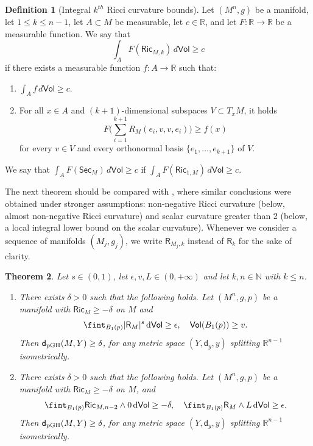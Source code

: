 \documentclass[10pt]{article}
\newtheorem{thm}{Theorem}[section]
\theoremstyle{definition}
\newtheorem{definition}[thm]{Definition}
\newcommand{\bb}[1]{\mathbb{#1}}
\newcommand{\ssf}[1]{\mathsf{#1}}
\newcommand{\Ric}{\mathsf{Ric}}
\newcommand{\sd}{\mathsf{d}}
\newcommand{\R}{\mathsf{R}}
\newcommand{\de}{{\rm d}}
\begin{document}
\begin{definition}[Integral $k^{th}$ Ricci curvature bounds] \label{D5}
Let $(M^n,g)$ be a manifold, let $1 \leq k \leq n-1$, let $A \subset M$ be measurable, let $c \in \bb{R}$, and let $F:\bb{R} \to \bb{R}$ be a measurable function.
We say that
\[
\int_{A} F(\Ric_{M,k}) \, d\ssf{Vol} \geq c
\]
if there exists a measurable function $f:A \to \bb{R}$ such that:
\begin{enumerate}
    \item $
    \int_A f \, d\ssf{Vol} \geq c.
    $
    \item For all $x \in A$ and $(k+1)$-dimensional subspaces $V \subset T_xM$, it holds
\[
F\Big( \sum_{i=1}^{k+1} R_M(e_i,v,v,e_i) \Big) \geq f(x)
\]
for every $v \in V$ and every orthonormal basis $\{e_1,\dots,e_{k+1}\}$ of $V$.
\end{enumerate}
We say that $
\int_{A} F(\ssf{Sec}_M ) \, d\ssf{Vol} \geq c
$ if $
\int_{A}  F(\Ric_{1,M}) \, d\ssf{Vol} \geq c
$.
\end{definition}

The next theorem should be compared with \cite[Theorem 1.1]{wang2023positive}, where similar conclusions were obtained under stronger assumptions: non-negative Ricci curvature (below, almost non-negative Ricci curvature) and scalar curvature greater than 2  (below, a local integral lower bound on the scalar curvature). 
Whenever we consider a sequence of manifolds $(M_j,g_j)$, we write $\R_{M_j,k}$ instead of $\R_k$ for the sake of clarity.

\begin{thm} \label{CT2}
    Let $s \in (0,1)$, let $\epsilon,v,L \in (0,+\infty)$ and let $k,n \in \bb{N}$ with $k \leq n$. 
    \begin{enumerate}
        \item \label{Thm4.7-1} There exists $\delta>0$ such that the following holds. Let $(M^n,g,p)$ be a manifold with $\Ric_{M} \geq -\delta$ on $M$ and
    \[
     \fint_{B_1(p)} |\R_{M}|^s \, \de \ssf{Vol}  \geq \epsilon, \quad \ssf{Vol}(B_1(p)) \geq v.
    \] 
    Then $\sd_{\rm{pGH}}(M,Y) \geq \delta$, for any metric space $(Y,\sd_y,y)$  splitting $\bb{R}^{n-1}$ isometrically.
    \item \label{Thm4.7-2}
    There exists $\delta>0$ such that the following holds. Let $(M^n,g,p)$ be a manifold with $\Ric_{M} \geq -\delta$ on $M$, and
    \[
    \fint_{B_1(p)} \ssf{Ric}_{M,n-2} \wedge 0 \, \de \ssf{Vol}  \geq -\delta, \quad 
     \fint_{B_1(p)} \R_{M} \wedge L \, \de \ssf{Vol}  \geq \epsilon.
    \] 
     Then $\sd_{\rm{pGH}}(M,Y) \geq \delta$, for any metric space $(Y,\sd_y,y)$  splitting $\bb{R}^{n-1}$ isometrically.
    \end{enumerate}
\end{thm}
    
\end{document}
